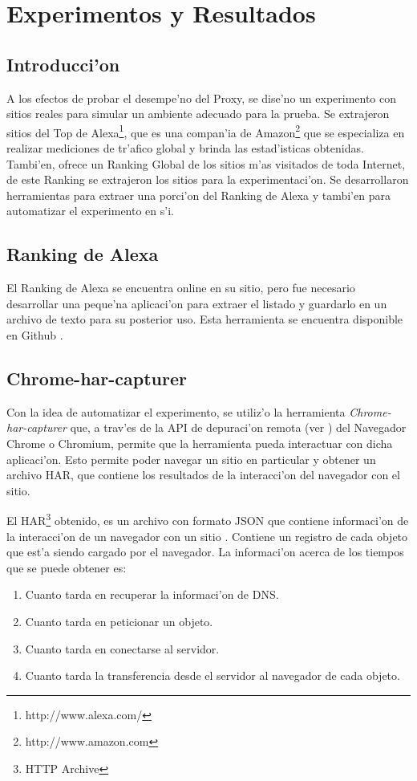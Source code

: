 \chapter{Experimentos y Resultados}

\section{Introducci'on}

A los efectos de probar el desempe'no del Proxy, se dise'no un experimento con sitios reales para simular un ambiente adecuado para la prueba. Se extrajeron sitios del Top de Alexa\footnote{http://www.alexa.com/}, que es una compan'ia de Amazon\footnote{http://www.amazon.com} que se especializa en realizar mediciones de tr'afico global y brinda las estad'isticas obtenidas. Tambi'en, ofrece un Ranking Global de los sitios m'as visitados de toda Internet, de este Ranking se extrajeron los sitios para la experimentaci'on. Se desarrollaron herramientas para extraer una porci'on del Ranking de Alexa y tambi'en para automatizar el experimento en s'i.

\section{Ranking de Alexa}
\label{rankingalexa}
El Ranking de Alexa se encuentra online en su sitio, pero fue necesario desarrollar una peque'na aplicaci'on para extraer el listado y guardarlo en un archivo de texto para su posterior uso. Esta herramienta se encuentra disponible en Github \citep{alexatop}.

\section{Chrome-har-capturer}

Con la idea de automatizar el experimento, se utiliz'o la herramienta \emph{Chrome-har-capturer} que, a trav'es de la API de depuraci'on remota (ver \citep{debugger}) del Navegador Chrome o Chromium, permite que la herramienta pueda interactuar con dicha aplicaci'on. Esto permite  poder navegar un sitio en particular y obtener un archivo HAR, que contiene los resultados de la interacci'on del navegador con el sitio.

El HAR\footnote{HTTP Archive} obtenido, es un archivo con formato JSON que contiene informaci'on de la interacci'on de un navegador con un sitio \citep{harSpec}. Contiene un registro de cada objeto que est'a siendo cargado por el navegador. La informaci'on acerca de los tiempos que se puede obtener es:
\begin{enumerate}
\item Cuanto tarda en recuperar la informaci'on de DNS.
\item Cuanto tarda en peticionar un objeto.
\item Cuanto tarda en conectarse al servidor.
\item Cuanto tarda la transferencia desde el servidor al navegador de cada objeto.
\end{enumerate}

